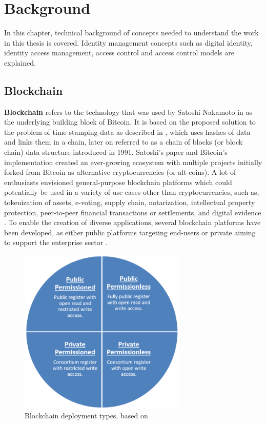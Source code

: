 \chapter{Background} \label{ch:background}

In this chapter, technical background of concepts needed to understand the work in this thesis is covered. Identity management concepts such as digital identity, identity access management, access control and access control models are explained.

\section{Blockchain} \label{ch:background-blockchain}

	\textbf{Blockchain}	refers to the technology that was used by Satoshi Nakamoto in \cite{nakamoto_bitcoin:_nodate} as the underlying building block of Bitcoin. It is based on the proposed solution to the problem of time-stamping data as described in \cite{haber_how_1991}, which uses hashes of data and links them in a chain, later on referred to as a chain of blocks (or block chain)  data structure introduced in 1991. Satoshi's paper and Bitcoin's implementation created an ever-growing ecosystem with multiple projects initially forked from Bitcoin as alternative cryptocurrencies (or alt-coins). A lot of enthusiasts envisioned general-purpose blockchain platforms which could potentially be used in a variety of use cases other than cryptocurrencies, such as, tokenization of assets, e-voting, supply chain, notarization, intellectual property protection, peer-to-peer financial transactions or settlements, and digital evidence \cite{noauthor_20_nodate}. To enable the creation of diverse applications, several blockchain platforms have been developed, as either public platforms targeting end-users or private aiming to support the enterprise sector \cite{noauthor_top_nodate}.    

\begin{figure}[!h]
	\centering
	\includegraphics[width=80mm]{figs/ch2/bc-chart}
	\caption{Blockchain deployment types, based on \cite{rodrigues_technology-driven_nodate}}
	\label{fig:bc-deployment-types}
\end{figure}


